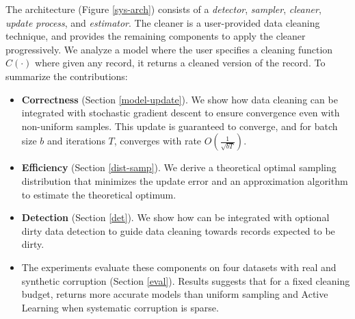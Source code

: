 


The \sys architecture (Figure \ref{sys-arch}) consists of a \emph{detector}, \emph{sampler}, \emph{cleaner}, \emph{update process}, and \emph{estimator}.
The cleaner is a user-provided data cleaning technique, and \sys provides the remaining components to apply the cleaner progressively.
We analyze a model where the user specifies a cleaning function $C(\cdot)$ where given any record, it returns a cleaned version of the record.
To summarize the contributions:
\begin{itemize}[noitemsep]
\item \textbf{Correctness} (Section \ref{model-update}). We show how data cleaning can be integrated with stochastic gradient descent to ensure convergence even with non-uniform samples. This update is guaranteed to converge, and for batch size $b$ and iterations $T$, converges with rate $O(\frac{1}{\sqrt{bT}})$. 
\item \textbf{Efficiency} (Section \ref{dist-samp}). We derive a theoretical optimal sampling distribution that minimizes the update error and an approximation algorithm to estimate the theoretical optimum.
\item \textbf{Detection} (Section \ref{det}). We show how \sys can be integrated with optional dirty data detection to guide data cleaning towards records expected to be dirty.
\item The experiments evaluate these components on four datasets with real and synthetic corruption (Section \ref{eval}). Results suggests that for a fixed cleaning budget, \sys returns more accurate models than uniform sampling and Active Learning when systematic corruption is sparse.

\end{itemize}






